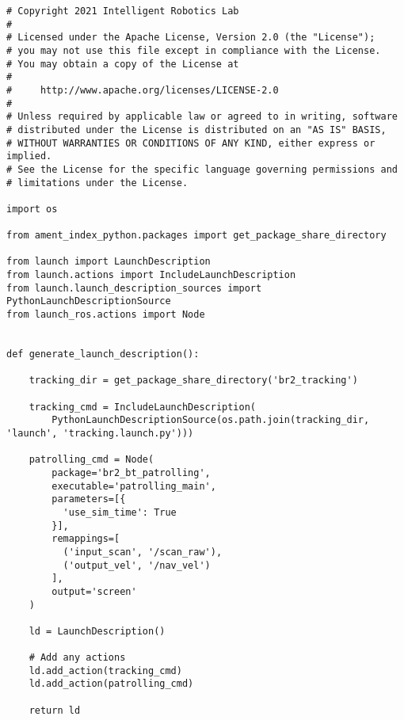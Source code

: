  \footnotesize
\begin{tcolorbox}[sharp corners, colframe=gray!80, colback=LightGray, left=0pt, top=0pt, bottom=0pt, title=\texttt{br2\_bt\_patrolling/launch/patrolling.launch.py}]
  \begin{verbatim}
# Copyright 2021 Intelligent Robotics Lab
#
# Licensed under the Apache License, Version 2.0 (the "License");
# you may not use this file except in compliance with the License.
# You may obtain a copy of the License at
#
#     http://www.apache.org/licenses/LICENSE-2.0
#
# Unless required by applicable law or agreed to in writing, software
# distributed under the License is distributed on an "AS IS" BASIS,
# WITHOUT WARRANTIES OR CONDITIONS OF ANY KIND, either express or implied.
# See the License for the specific language governing permissions and
# limitations under the License.

import os

from ament_index_python.packages import get_package_share_directory

from launch import LaunchDescription
from launch.actions import IncludeLaunchDescription
from launch.launch_description_sources import PythonLaunchDescriptionSource
from launch_ros.actions import Node


def generate_launch_description():

    tracking_dir = get_package_share_directory('br2_tracking')

    tracking_cmd = IncludeLaunchDescription(
        PythonLaunchDescriptionSource(os.path.join(tracking_dir, 'launch', 'tracking.launch.py')))

    patrolling_cmd = Node(
        package='br2_bt_patrolling',
        executable='patrolling_main',
        parameters=[{
          'use_sim_time': True
        }],
        remappings=[
          ('input_scan', '/scan_raw'),
          ('output_vel', '/nav_vel')
        ],
        output='screen'
    )

    ld = LaunchDescription()

    # Add any actions
    ld.add_action(tracking_cmd)
    ld.add_action(patrolling_cmd)

    return ld
    \end{verbatim}
    \end{tcolorbox}
  \normalsize

